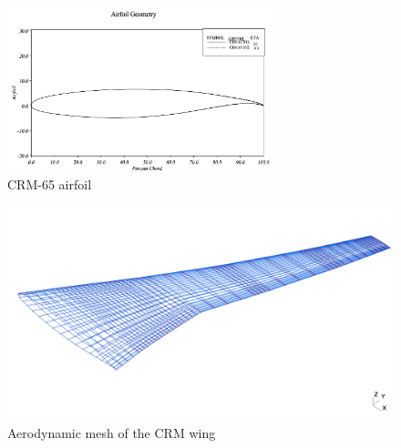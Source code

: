 \begin{figure}[H]
	\centering
	\includegraphics[width = 0.7\textwidth]{./Immagini/5_6.png}
	\caption{CRM-65 airfoil}
	\label{fig:5_5}
\end{figure}
\begin{figure}[H]
	\centering
	\includegraphics[width = 1\textwidth]{./Immagini/5_7.png}
	\caption{Aerodynamic mesh of the CRM wing}
	\label{fig:5_6}
\end{figure}
